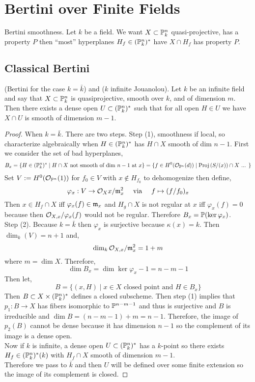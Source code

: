 \documentclass[12pt]{article}
\begin{document}
\section{Bertini over Finite Fields}

Bertini smoothness. Let $k$ be a field. We want $X \subset \P^n_k$ quasi-projective, has a property $P$ then ``most'' hyperplanes $H_f \in (\P^n_k)^*$ have $X \cap H_f$ has property $P$.

\subsection{Classical Bertini}

\begin{thm}
(Bertini for the case $k = \bar{k}$) and ($k$ infinite Jouanolou). Let $k$ be an infinite field and say that $X \subset \P^n_k$ is quasiprojective, smooth over $k$, and of dimension $m$. Then there exists a dense open $U \subset (\P_k^n)^*$ such that for all open $H \in U$ we have $X \cap U$ is smooth of dimension $m - 1$. 
\end{thm}

\begin{proof}
When $k = \bar{k}$. There are two steps. Step (1), smoothness if local, so characterize algebraically when $H \in (\P^n_k)^*$ has $H \cap X$ smooth of dim $n - 1$. First we consider the set of bad hyperplanes,
\[ B_x = \{ H \in (\P^n_k)^* \mid H \cap X \text{ not smooth of dim } n - 1 \text{ at } x \} = \{ f \in H^0(\struct{\P^n}(d)) \mid \Proj{S / (x)} \cap X \text{ ... } \} \]
Set $V := H^0(\struct{\P^n}(1))$ for $f_0 \in V$ with $x \notin H_{f_0}$ to dehomogenize then define,
\[ \varphi_x : V \to \struct{X}{x} / \m_{x}^2 \quad \text{ via } \quad f \mapsto (f / f_0)_x \]
Then $x \in H_f \cap X$ iff $\varphi_x(f) \in \m_x$ and $H_g \cap X$ is not regular at $x$ iff $\varphi_x(f) = 0$ because then $\stalk{X}{x} / \varphi_x(f)$ would not be regular. Therefore $B_x = \P(\ker{\varphi_x})$. 
\bigskip\\
Step (2). Because $k = \bar{k}$ then $\varphi_x$ is surjective because $\kappa(x) = k$. Then $\dim_k(V) = n + 1$ and,
\[ \dim_k \stalk{X}{x} / \m_x^2 = 1 + m \]
where $m = \dim{X}$. Therefore,
\[ \dim{B_x} = \dim{\ker{\varphi_x}} - 1 = n - m - 1 \] 
Then let,
\[ B = \{ (x, H) \mid x \in X \text{ closed point and } H \in B_x \} \]
Then $B \subset X \times (\P^n_k)^*$ defines a closed subscheme. Then step (1) implies that $p_1 : B \to X$ has fibers isomorphic to $\P^{n-m-1}$ and thus is surjective and $B$ is irreducible and $\dim{B} = (n - m - 1) + m = n - 1$. Therefore, the image of $p_2(B)$ cannot be dense because it has dimension $n - 1$ so the complement of its image is a dense open.
\bigskip\\
Now if $k$ is infinite, a dense open $U \subset (\P_k^n)^*$ has a $k$-point so there exists $H_f \in (\P^n_k)^*(k)$ with $H_f \cap X$ smooth of dimension $m - 1$.  
\bigskip\\
Therefore we pass to $\bar{k}$ and then $U$ will be defined over some finite extension so the image of its complement is closed.
\end{proof}
\end{document}
